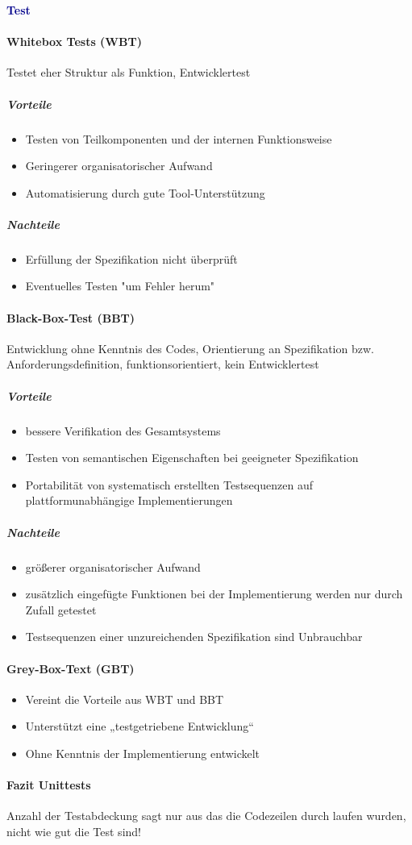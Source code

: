 \textbf{\textcolor{darkblue}{Test}}~
\paragraph{Whitebox Tests (WBT)}
Testet eher Struktur als Funktion, Entwicklertest

\subparagraph{Vorteile}
\begin{itemize}
	\item Testen von Teilkomponenten und der internen Funktionsweise
	\item Geringerer organisatorischer Aufwand
	\item Automatisierung durch gute Tool-Unterstützung
\end{itemize}

\subparagraph{Nachteile}
\begin{itemize}
	\item Erfüllung der Spezifikation nicht überprüft
	\item Eventuelles Testen "um Fehler herum"
\end{itemize}

\paragraph{Black-Box-Test (BBT)}
 Entwicklung ohne Kenntnis des Codes, Orientierung an Spezifikation bzw. Anforderungsdefinition,
 funktionsorientiert, kein Entwicklertest
 
\subparagraph{Vorteile}
\begin{itemize}
	\item bessere Verifikation des Gesamtsystems
	\item Testen von semantischen Eigenschaften bei geeigneter Spezifikation
	\item Portabilität von systematisch erstellten Testsequenzen auf plattformunabhängige Implementierungen
\end{itemize}

\subparagraph{Nachteile}
\begin{itemize}
	\item größerer organisatorischer Aufwand
	\item zusätzlich eingefügte Funktionen bei der Implementierung werden nur durch Zufall getestet
	\item Testsequenzen einer unzureichenden Spezifikation sind Unbrauchbar
\end{itemize}

\paragraph{Grey-Box-Text (GBT)}
\begin{itemize}
	\item Vereint die Vorteile aus WBT und BBT
	\item Unterstützt eine „testgetriebene Entwicklung“
	\item Ohne Kenntnis der Implementierung entwickelt
\end{itemize}

\paragraph{Fazit Unittests}
Anzahl der Testabdeckung sagt nur aus das die Codezeilen durch laufen wurden, nicht wie gut die Test sind!